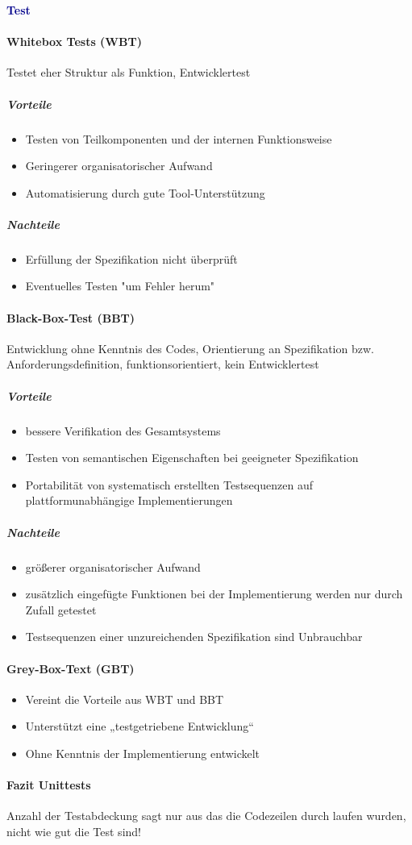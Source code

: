 \textbf{\textcolor{darkblue}{Test}}~
\paragraph{Whitebox Tests (WBT)}
Testet eher Struktur als Funktion, Entwicklertest

\subparagraph{Vorteile}
\begin{itemize}
	\item Testen von Teilkomponenten und der internen Funktionsweise
	\item Geringerer organisatorischer Aufwand
	\item Automatisierung durch gute Tool-Unterstützung
\end{itemize}

\subparagraph{Nachteile}
\begin{itemize}
	\item Erfüllung der Spezifikation nicht überprüft
	\item Eventuelles Testen "um Fehler herum"
\end{itemize}

\paragraph{Black-Box-Test (BBT)}
 Entwicklung ohne Kenntnis des Codes, Orientierung an Spezifikation bzw. Anforderungsdefinition,
 funktionsorientiert, kein Entwicklertest
 
\subparagraph{Vorteile}
\begin{itemize}
	\item bessere Verifikation des Gesamtsystems
	\item Testen von semantischen Eigenschaften bei geeigneter Spezifikation
	\item Portabilität von systematisch erstellten Testsequenzen auf plattformunabhängige Implementierungen
\end{itemize}

\subparagraph{Nachteile}
\begin{itemize}
	\item größerer organisatorischer Aufwand
	\item zusätzlich eingefügte Funktionen bei der Implementierung werden nur durch Zufall getestet
	\item Testsequenzen einer unzureichenden Spezifikation sind Unbrauchbar
\end{itemize}

\paragraph{Grey-Box-Text (GBT)}
\begin{itemize}
	\item Vereint die Vorteile aus WBT und BBT
	\item Unterstützt eine „testgetriebene Entwicklung“
	\item Ohne Kenntnis der Implementierung entwickelt
\end{itemize}

\paragraph{Fazit Unittests}
Anzahl der Testabdeckung sagt nur aus das die Codezeilen durch laufen wurden, nicht wie gut die Test sind!